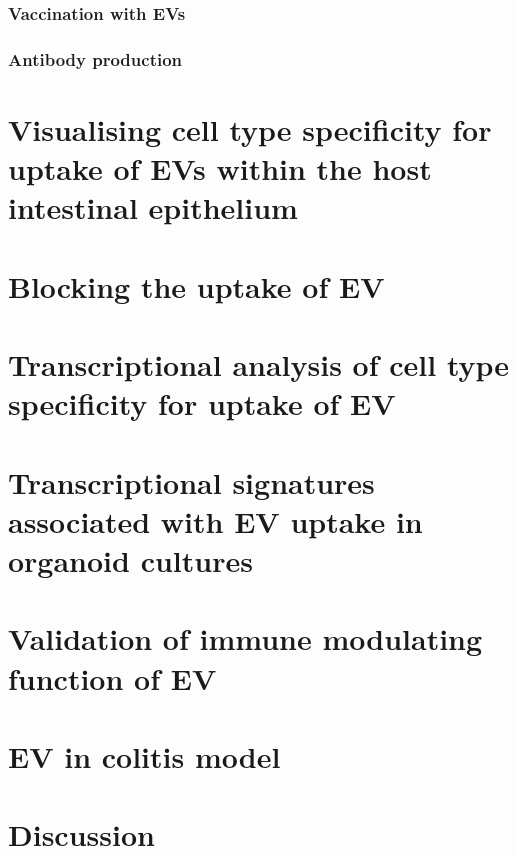 \documentclass[a4paper]{report}
\begin{document}
\subsection{Vaccination with  EVs}
\subsection{Antibody production}
\newpage\chapter{Visualising cell type specificity for uptake of EVs within the host intestinal epithelium}
\newpage\chapter{Blocking the uptake of EV}
\newpage\chapter{Transcriptional analysis of cell type specificity for uptake of EV}
\newpage\chapter{Transcriptional signatures associated with EV uptake in organoid cultures}
\newpage\chapter{Validation of immune modulating function of EV}
\newpage\chapter{EV in colitis model}
\newpage\chapter{Discussion}





\newpage



\end{document}
